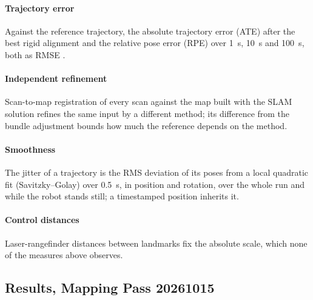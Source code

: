 \paragraph{Trajectory error} Against the reference trajectory, the absolute
trajectory error (ATE) after the best rigid alignment and the relative pose
error (RPE) over \SI{1}{\second}, \SI{10}{\second} and \SI{100}{\second},
both as RMSE \cite{sturm2012}.

\paragraph{Independent refinement} Scan-to-map registration of every scan
against the map built with the SLAM solution refines the same input by a
different method; its difference from the bundle adjustment bounds how much
the reference depends on the method.

\paragraph{Smoothness} The jitter of a trajectory is the RMS deviation of
its poses from a local quadratic fit (Savitzky--Golay) over
\SI{0.5}{\second}, in position and rotation, over the whole run and while
the robot stands still; a timestamped position inherits it.

\paragraph{Control distances} Laser-rangefinder distances between landmarks
fix the absolute scale, which none of the measures above observes.

\subsection{Results, Mapping Pass 20261015}


